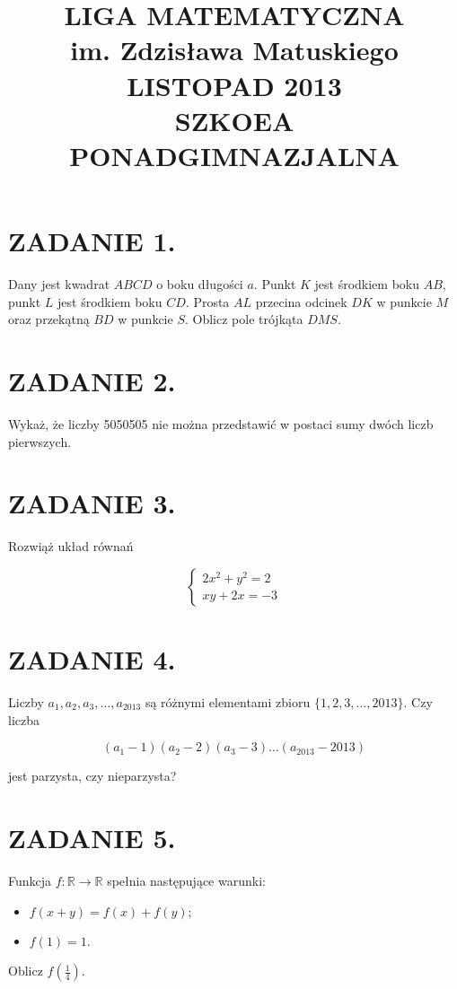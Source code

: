\documentclass[10pt]{article}
\title{LIGA MATEMATYCZNA \\
 im. Zdzisława Matuskiego \\
 LISTOPAD 2013 \\
 SZKOEA PONADGIMNAZJALNA }
\author{}
\date{}
\begin{document}
\maketitle
\section*{ZADANIE 1.}
Dany jest kwadrat \(A B C D\) o boku długości \(a\). Punkt \(K\) jest środkiem boku \(A B\), punkt \(L\) jest środkiem boku \(C D\). Prosta \(A L\) przecina odcinek \(D K\) w punkcie \(M\) oraz przekątną \(B D\) w punkcie \(S\). Oblicz pole trójkąta \(D M S\).

\section*{ZADANIE 2.}
Wykaż, że liczby 5050505 nie można przedstawić w postaci sumy dwóch liczb pierwszych.

\section*{ZADANIE 3.}
Rozwiąż układ równań

\[
\left\{\begin{array}{l}
2 x^{2}+y^{2}=2 \\
x y+2 x=-3
\end{array}\right.
\]

\section*{ZADANIE 4.}
Liczby \(a_{1}, a_{2}, a_{3}, \ldots, a_{2013}\) są różnymi elementami zbioru \(\{1,2,3, \ldots, 2013\}\). Czy liczba

\[
\left(a_{1}-1\right)\left(a_{2}-2\right)\left(a_{3}-3\right) \ldots\left(a_{2013}-2013\right)
\]

jest parzysta, czy nieparzysta?

\section*{ZADANIE 5.}
Funkcja \(f: \mathbb{R} \rightarrow \mathbb{R}\) spełnia następujące warunki:

\begin{itemize}
  \item \(f(x+y)=f(x)+f(y) ;\)
  \item \(f(1)=1\).
\end{itemize}

Oblicz \(f\left(\frac{1}{4}\right)\).
\end{document}

